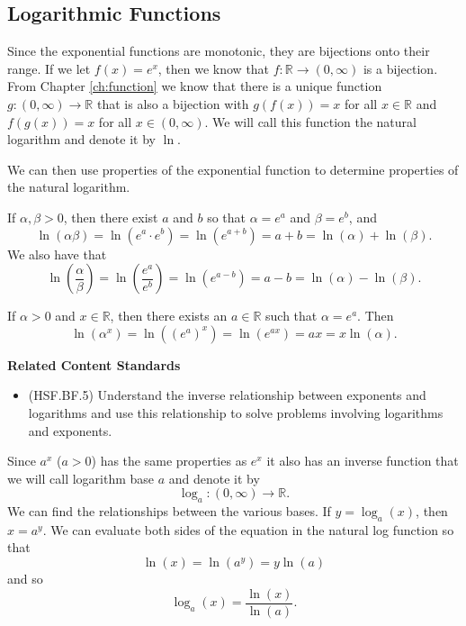 \documentclass[
]{book}
\providecommand{\tightlist}{%
  \setlength{\itemsep}{0pt}\setlength{\parskip}{0pt}}
\newenvironment{standards}{}{}
\theoremstyle{definition}
\theoremstyle{definition}
\theoremstyle{definition}
\theoremstyle{definition}
\theoremstyle{remark}
\begin{document}
\hypertarget{logarithmic-functions}{%
\subsection{Logarithmic Functions}\label{logarithmic-functions}}

Since the exponential functions are monotonic, they are bijections onto their range. If we let \(f(x)=e^x\), then we know that \(f:\mathbb{R} \rightarrow (0,\infty)\) is a bijection. From Chapter \ref{ch:function} we know that there is a unique function \(g:(0,\infty) \rightarrow \mathbb{R}\) that is also a bijection with \(g(f(x))=x\) for all \(x\in \mathbb{R}\) and \(f(g(x))=x\) for all \(x\in (0,\infty)\). We will call this function the natural logarithm and denote it by \(\ln\).

We can then use properties of the exponential function to determine properties of the natural logarithm.

If \(\alpha,\beta >0\), then there exist \(a\) and \(b\) so that \(\alpha = e^a\) and \(\beta = e^b\), and \[\ln (\alpha \beta) = \ln \left( e^a \cdot e^b\right) = \ln \left(e^{a+b}\right) = a+b = \ln (\alpha) + \ln (\beta). \] We also have that
\[\ln \left(\frac{\alpha}{\beta}\right) = \ln \left( \frac{e^a}{e^b} \right) = \ln \left( e^{a-b} \right) = a-b = \ln(\alpha) - \ln(\beta).\]

If \(\alpha>0\) and \(x\in \mathbb{R}\), then there exists an \(a\in \mathbb{R}\) such that \(\alpha=e^a\). Then
\[\ln \left(\alpha^x\right) = \ln \left( \left(e^a\right)^x\right) = \ln \left( e^{ax} \right) = ax = x \ln(\alpha).\]

\begin{standards}

\begin{center}
\textbf{Related Content Standards}

\end{center}

\begin{itemize}
\tightlist
\item
  (HSF.BF.5) Understand the inverse relationship between exponents and logarithms and use this relationship to solve problems involving logarithms and exponents.\\
\end{itemize}

\end{standards}

Since \(a^x\) (\(a>0\)) has the same properties as \(e^x\) it also has an inverse function that we will call logarithm base \(a\) and denote it by \[ \log_a: (0,\infty) \rightarrow \mathbb{R}.\] We can find the relationships between the various bases. If \(y= \log_a(x)\), then \(x=a^y\). We can evaluate both sides of the equation in the natural log function so that
\[\ln(x) = \ln\left(a^y\right) = y \ln (a)\] and so
\[\log_a(x) = \frac{\ln(x)}{\ln(a)}.\]
\end{document}
